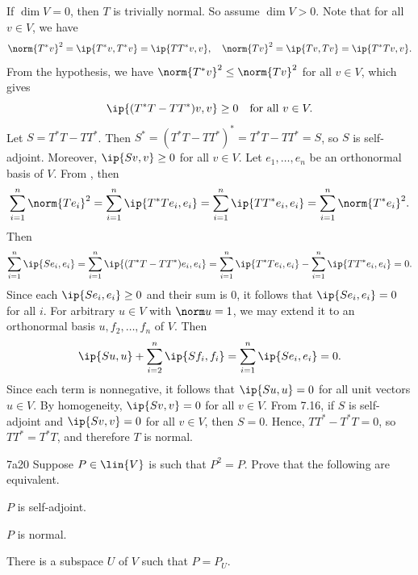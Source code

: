 \begin{sol}
    If $\dim V = 0$, then $T$ is trivially normal. So assume $\dim V > 0$.
    Note that for all $v \in V$, we have
    \[
        \norm{T^\ast v}^2 = \ip{T^\ast v, T^\ast v} = \ip{TT^\ast v, v}, \quad \norm{Tv}^2 = \ip{Tv, Tv} = \ip{T^\ast Tv, v}.
    \]
    From the hypothesis, we have $\norm{T^\ast v}^2 \leq \norm{Tv}^2$ for all $v \in V$, which gives
    \[
        \ip{(T^\ast T - TT^\ast)v, v} \geq 0 \quad \text{for all } v \in V.
    \]
    Let $S = T^\ast T - TT^\ast$.
    Then $S^\ast = (T^\ast T - TT^\ast)^\ast = T^\ast T - TT^\ast = S$, so $S$ is self-adjoint.
    Moreover, $\ip{Sv, v} \geq 0$ for all $v \in V$.
    Let $e_1, \ldots, e_n$ be an orthonormal basis of $V$.
    From , then
    \[
        \sum_{i=1}^n \norm{Te_i}^2 = \sum_{i=1}^n \ip{T^\ast Te_i, e_i} = \sum_{i=1}^n \ip{TT^\ast e_i, e_i} = \sum_{i=1}^n \norm{T^\ast e_i}^2.
    \]
    Then
    \[
        \sum_{i=1}^n \ip{Se_i, e_i} = \sum_{i=1}^n \ip{(T^\ast T - TT^\ast)e_i, e_i} = \sum_{i=1}^n \ip{T^\ast Te_i, e_i} - \sum_{i=1}^n \ip{TT^\ast e_i, e_i} = 0.
    \]
    Since each $\ip{Se_i, e_i} \geq 0$ and their sum is $0$, it follows that $\ip{Se_i, e_i} = 0$ for all $i$.
    For arbitrary $u \in V$ with $\norm u = 1$, we may extend it to an orthonormal basis $u, f_2, \ldots, f_n$ of $V$.
    Then
    \[
        \ip{Su, u} + \sum_{i=2}^n \ip{Sf_i, f_i} = \sum_{i=1}^n \ip{Se_i, e_i} = 0.
    \]
    Since each term is nonnegative, it follows that $\ip{Su, u} = 0$ for all unit vectors $u \in V$.
    By homogeneity, $\ip{Sv, v} = 0$ for all $v \in V$.
    From 7.16, if $S$ is self-adjoint and $\ip{Sv, v} = 0$ for all $v \in V$, then $S = 0$. 
    Hence, $TT^\ast - T^\ast T = 0$, so $TT^\ast = T^\ast T$, and therefore $T$ is normal.
\end{sol}

\begin{exercise}{7a20}
    Suppose $P \in \lin{V}$ is such that $P^2 = P$.
    Prove that the following are equivalent.
    \begin{subexercises}
        \item $P$ is self-adjoint.
        \item $P$ is normal.
        \item There is a subspace $U$ of $V$ such that $P = P_U$.
    \end{subexercises}
\end{exercise}

